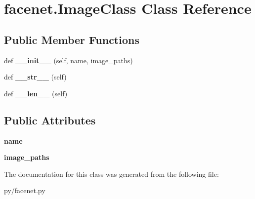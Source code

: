 \hypertarget{classfacenet_1_1ImageClass}{}\section{facenet.\+Image\+Class Class Reference}
\label{classfacenet_1_1ImageClass}
\subsection*{Public Member Functions}
\begin{DoxyCompactItemize}
\item 
def {\bfseries \+\_\+\+\_\+init\+\_\+\+\_\+} (self, name, image\+\_\+paths)\hypertarget{classfacenet_1_1ImageClass_a9cd9daa35d2f22f9d3cf61404f0fa93b}{}\label{classfacenet_1_1ImageClass_a9cd9daa35d2f22f9d3cf61404f0fa93b}

\item 
def {\bfseries \+\_\+\+\_\+str\+\_\+\+\_\+} (self)\hypertarget{classfacenet_1_1ImageClass_a51a4385e652bbbd415c21d68d94d16d6}{}\label{classfacenet_1_1ImageClass_a51a4385e652bbbd415c21d68d94d16d6}

\item 
def {\bfseries \+\_\+\+\_\+len\+\_\+\+\_\+} (self)\hypertarget{classfacenet_1_1ImageClass_a0fef51f010849335f39d39015bcc6ae3}{}\label{classfacenet_1_1ImageClass_a0fef51f010849335f39d39015bcc6ae3}

\end{DoxyCompactItemize}
\subsection*{Public Attributes}
\begin{DoxyCompactItemize}
\item 
{\bfseries name}\hypertarget{classfacenet_1_1ImageClass_a9be0826646711d9200a31b8c5cfcf1c2}{}\label{classfacenet_1_1ImageClass_a9be0826646711d9200a31b8c5cfcf1c2}

\item 
{\bfseries image\+\_\+paths}\hypertarget{classfacenet_1_1ImageClass_afd647167440b4ab86847ae2954771a69}{}\label{classfacenet_1_1ImageClass_afd647167440b4ab86847ae2954771a69}

\end{DoxyCompactItemize}


The documentation for this class was generated from the following file\+:\begin{DoxyCompactItemize}
\item 
py/facenet.\+py\end{DoxyCompactItemize}

